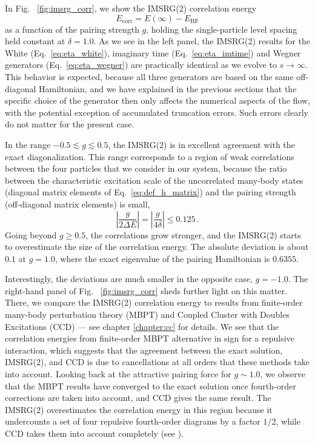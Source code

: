 {In Fig.~ \ref{fig:imsrg_corr}, we show the IMSRG(2) correlation energy
\begin{equation}
  E_\text{corr} = E(\infty) - E_\text{HF}
\end{equation}
as a function of the pairing strength $g$, holding the single-particle 
level spacing held constant at $\delta=1.0$. As we see in the left panel, 
the IMSRG(2) results for the White (Eq.~\eqref{eq:eta_white}), imaginary
time (Eq.~\eqref{eq:eta_imtime}) and Wegner generators (Eq.~\eqref{eq:eta_wegner})
are practically identical as we evolve to $s\to\infty$. This behavior
is expected, because all three generators are based on the same off-diagonal
Hamiltonian, and we have explained in the previous sections that the 
specific choice of the generator then only affects the numerical aspects
of the flow, with the potential exception of accumulated truncation
errors. Such errors clearly do not matter for the present case.

In the range $-0.5\lesssim g \lesssim 0.5$, the IMSRG(2) is in excellent 
agreement with the exact diagonalization. This range corresponds to 
a region of weak correlations between the four particles that we 
consider in our system, because the ratio between the characteristic excitation
scale of the uncorrelated many-body states (diagonal matrix elements of 
Eq.~\eqref{eq:def_h_matrix}) and the pairing strength (off-diagonal matrix 
elements) is small,
\begin{equation}
  \left|\frac{g}{2\Delta E}\right| = \left|\frac{g}{4\delta}\right| \leq 0.125\,.
\end{equation}
Going beyond $g\geq 0.5$, the correlations grow stronger, and the IMSRG(2) 
starts to overestimate the size of the correlation energy. The absolute 
deviation is about $0.1$ at $g=1.0$, where the exact eigenvalue of the pairing 
Hamiltonian is $0.6355$. 

Interestingly, the deviations are much smaller in the opposite case, $g=-1.0$. The 
right-hand panel of Fig.~ \ref{fig:imsrg_corr} sheds further light on this matter.
There, we compare the IMSRG(2) correlation energy to results from finite-order
many-body perturbation theory (MBPT) and Coupled Cluster with Doubles Excitations
(CCD) --- see chapter \ref{chapter:cc} for details. We see that the correlation
energies from finite-order MBPT alternative in sign for a repulsive interaction,
which suggests that the agreement between the exact solution, IMSRG(2), and CCD
is due to cancellations at all orders that these methods take into account.
Looking back at the attractive pairing force for $g\sim1.0$, we observe that 
the MBPT results have converged to the exact solution once fourth-order 
corrections are taken into account, and CCD gives the same result. The
IMSRG(2) overestimates the correlation energy in this region because it 
undercounts a set of four repulsive fourth-order diagrams by a factor $1/2$,
while CCD takes them into account completely 
(see \cite{Hergert:2016jk,Parzuchowski:2016pi}).

}
